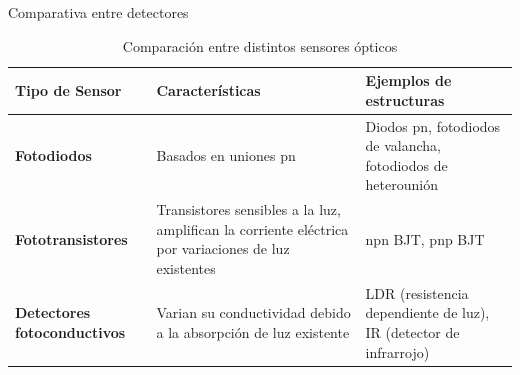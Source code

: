 \documentclass[aspectratio=169]{beamer}
\begin{document}
\begin{frame}{Comparativa entre detectores}
    \begin{table}[]
 \footnotesize
    \centering
    \begin{tabular}{m{2.6cm} m{3.8cm} m{3.8cm}}
        \toprule
        \textbf{Tipo de Sensor} & \textbf{Características} & \textbf{Ejemplos de estructuras}\\
        \midrule
        \textbf{Fotodiodos} & Basados en uniones pn & Diodos pn, fotodiodos de valancha, fotodiodos de heterounión\\
        \textbf{Fototransistores} & Transistores sensibles a la luz, amplifican la corriente eléctrica por variaciones de luz existentes & npn BJT, pnp BJT\\
        \textbf{Detectores fotoconductivos} & Varian su conductividad debido a la absorpción de luz existente & LDR (resistencia dependiente de luz), IR (detector de infrarrojo) \\

        \bottomrule
    \end{tabular}
    \tiny{\caption{Comparación entre distintos sensores ópticos} \cite{sole2005instrumentacion}}
    \label{tab:Comparacion_sensores}
\end{table}
\end{frame}
\end{document}
